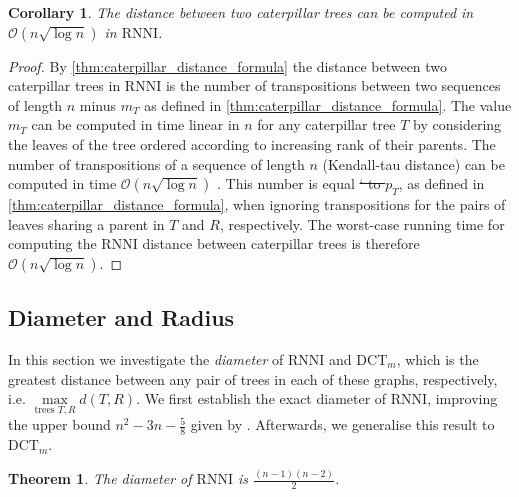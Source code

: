 \documentclass[11pt]{amsart}
\newtheorem{theorem}{Theorem}
\newtheorem{corollary}{Corollary}
\newcommand{\rnni}{\mathrm{RNNI}}
\newcommand{\dtt}{\mathrm{DCT}}
\newcommand{\dct}{\mathrm{DCT}} %
\renewcommand{\O}{\mathcal O}
\newcommand{\summary}[1]{} %
\providecommand{\DIFaddtex}[1]{{\protect\color{blue}\uwave{#1}}} %
\providecommand{\DIFdeltex}[1]{{\protect\color{red}\sout{#1}}}                      %
\providecommand{\DIFaddbegin}{} %
\providecommand{\DIFaddend}{} %
\providecommand{\DIFdelbegin}{} %
\providecommand{\DIFdelend}{} %
\providecommand{\DIFadd}[1]{\texorpdfstring{\DIFaddtex{#1}}{#1}} %
\providecommand{\DIFdel}[1]{\texorpdfstring{\DIFdeltex{#1}}{}} %
\newcommand{\DIFscaledelfig}{0.5}
\newlength{\DIFdelgraphicswidth} %
\newlength{\DIFdelgraphicsheight} %
\newcommand{\DIFaddincludegraphics}[2][]{{\color{blue}\fbox{\DIFOincludegraphics[#1]{#2}}}} %
\newcommand{\DIFdelincludegraphics}[2][]{%
\sbox{\DIFdelgraphicsbox}{\DIFOincludegraphics[#1]{#2}}%
\settoboxwidth{\DIFdelgraphicswidth}{\DIFdelgraphicsbox} %
\settoboxtotalheight{\DIFdelgraphicsheight}{\DIFdelgraphicsbox} %
\scalebox{\DIFscaledelfig}{%
\parbox[b]{\DIFdelgraphicswidth}{\usebox{\DIFdelgraphicsbox}\\[-\baselineskip] \rule{\DIFdelgraphicswidth}{0em}}\llap{\resizebox{\DIFdelgraphicswidth}{\DIFdelgraphicsheight}{%
\setlength{\unitlength}{\DIFdelgraphicswidth}%
\begin{picture}(1,1)%
\thicklines\linethickness{2pt} %
{\color[rgb]{1,0,0}\put(0,0){\framebox(1,1){}}}%
{\color[rgb]{1,0,0}\put(0,0){\line( 1,1){1}}}%
{\color[rgb]{1,0,0}\put(0,1){\line(1,-1){1}}}%
\end{picture}%
}\hspace*{3pt}}} %
} %
\DeclareRobustCommand{\DIFaddbegin}{\DIFOaddbegin \let\includegraphics\DIFaddincludegraphics} %
\DeclareRobustCommand{\DIFaddend}{\DIFOaddend \let\includegraphics\DIFOincludegraphics} %
\DeclareRobustCommand{\DIFdelbegin}{\DIFOdelbegin \let\includegraphics\DIFdelincludegraphics} %
\DeclareRobustCommand{\DIFdelend}{\DIFOaddend \let\includegraphics\DIFOincludegraphics} %
\begin{document}
\begin{corollary}
	The distance between two caterpillar trees can be computed in $\O(n \sqrt{\log n})$ in $\rnni$.
	\label{cor:caterpillar_distance_rnni_nlogn}
\end{corollary}
\vspace{-0.66cm}

\begin{proof}
	By \autoref{thm:caterpillar_distance_formula} the distance between two caterpillar trees in $\rnni$ is the number of transpositions between two sequences of length $n$ minus \DIFdelbegin \DIFdel{$m_T$ }\DIFdelend \DIFaddbegin \DIFadd{$m(T,R)$ }\DIFaddend as defined in \autoref{thm:caterpillar_distance_formula}.
	The value \DIFdelbegin \DIFdel{$m_T$ }\DIFdelend \DIFaddbegin \DIFadd{$m(T,R)$ }\DIFaddend can be computed in time linear in $n$ for any caterpillar tree $T$ by considering the leaves of the tree ordered according to increasing rank of their parents.
	The number of transpositions of a sequence of length $n$ (Kendall-tau distance) can be computed in time $\O(n \sqrt{\log n})$ \autocite{Chan2010-ls}.
	This number is equal \DIFdelbegin \DIFdel{` to $p_T$}\DIFdelend \DIFaddbegin \DIFadd{to $p(T,R)$}\DIFaddend , as defined in \autoref{thm:caterpillar_distance_formula}, when ignoring transpositions for the pairs of leaves sharing a parent in $T$ and $R$, respectively.
	The worst-case running time for computing the $\rnni$ distance between caterpillar trees is therefore $\O(n \sqrt{\log n})$.
\end{proof}

\subsection{Diameter and Radius}

\label{section:diameter}
\summary{Definition of Diameter.}
In this section we  investigate the \emph{diameter} of $\rnni$ and \DIFdelbegin \DIFdel{$\dtt_m$}\DIFdelend \DIFaddbegin \DIFadd{$\dct_m$}\DIFaddend , which is the greatest distance between any pair of trees in each of these graphs, respectively, i.e. $\max\limits_{\text{trees }T,R}d(T,R)$.
We first establish the exact diameter of $\rnni$, improving the upper bound $n^2 - 3n - \frac{5}{8}$ given by \textcite{Gavryushkin2018-ol}.
Afterwards, we generalise this result to \DIFdelbegin \DIFdel{$\dtt_m$}\DIFdelend \DIFaddbegin \DIFadd{$\dct_m$}\DIFaddend .

\begin{theorem}
	The diameter of $\rnni$ is $\frac{(n-1)(n-2)}{2}$.
	\label{thm:diameter_rnni}
\end{theorem}
\end{document}
